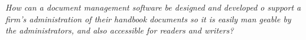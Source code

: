 \begin{center}
\textit{How can a document management software be designed and developed
o support a firm's administration of their handbook documents so it is easily man
geable by the administrators, and also accessible for readers and writers?}
\end{center}
